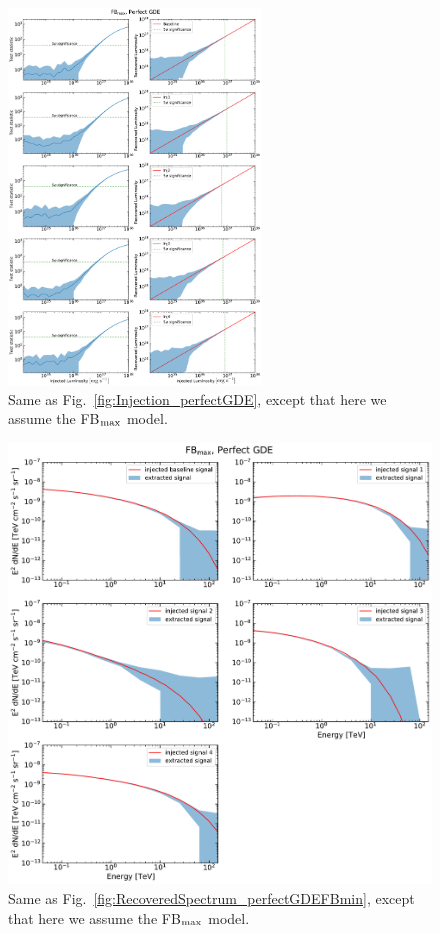 \documentclass[doublespace,nopageskip]{VTthesis} %
\begin{document}
 \begin{figure}
    \begin{center}
    \includegraphics[width=0.6\textwidth]{Figures/CTA/all-TS-mis-False-Fermi-min-False.pdf}
    \caption{Same as Fig.~\ref{fig:Injection_perfectGDE}, except that here we assume the FB$_{\rm max}$ model.}\label{fig:Injection_perfectGDEFBmax}
    \end{center}
\end{figure}

\begin{figure}
    \begin{center}
    \includegraphics[width=\textwidth]{Figures/CTA/all-signal-spectra-mis-False-Fermi-min-False.pdf}
    \caption{Same as Fig.~\ref{fig:RecoveredSpectrum_perfectGDEFBmin}, except that here we assume the FB$_{\rm max}$ model. }\label{fig:RecoveredSpectrum_perfectGDEFBmax}
    \end{center}
\end{figure}
\end{document}
